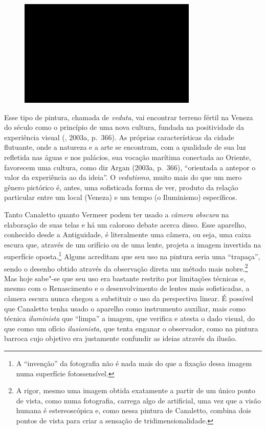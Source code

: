 \begin{figure}[!ht]

\centering
 \includegraphics[width=85mm]{./imgs/im1.jpg}
\caption{\tiny{}}

\end{figure}

Esse tipo de pintura, chamada de \emph{veduta}, vai encontrar terreno
fértil na Veneza do século  como o princípio de uma nova cultura,
fundada na positividade da experiência visual (, 2003a, p.~366). As
próprias características da cidade flutuante, onde a natureza e a arte
se encontram, com a qualidade de sua luz refletida nas águas e nos
palácios, sua vocação marítima conectada ao Oriente, favorecem uma
cultura, como diz Argan (2003a, p.~366), ``orientada a antepor o valor
da experiência ao da ideia''. O \emph{vedutismo}, muito mais do que um
mero gênero pictórico é, antes, uma sofisticada forma de ver, produto da
relação particular entre um local (Veneza) e um tempo (o Iluminismo)
específicos.

Tanto Canaletto quanto Vermeer podem ter usado a \emph{câmera obscura}
na elaboração de suas telas e há um caloroso debate acerca disso. Esse
aparelho, conhecido desde a Antiguidade, é literalmente uma câmera, ou
seja, uma caixa escura que, através de um orifício ou de uma lente,
projeta a imagem invertida na superfície oposta.\footnote{A ``invenção''
  da fotografia não é nada mais do que a fixação dessa imagem numa
  superfície fotossensível.} Alguns acreditam que seu uso na pintura
seria uma ``trapaça'', sendo o desenho obtido através da observação
direta um método mais nobre.\footnote{A rigor, mesmo uma imagem obtida
  exatamente a partir de um único ponto de vista, como numa fotografia,
  carrega algo de artificial, uma vez que a visão humana é
  estereoscópica e, como nessa pintura de Canaletto, combina dois pontos
  de vista para criar a sensação de tridimensionalidade.} Mas hoje
sabe"-se que seu uso era bastante restrito por limitações técnicas e,
mesmo com o Renascimento e o desenvolvimento de lentes mais
sofisticadas, a câmera escura nunca chegou a substituir o uso da
perspectiva linear. É possível que Canaletto tenha usado o aparelho como
instrumento auxiliar, mais como técnica \emph{iluminista} que ``limpa''
a imagem, que verifica e atesta o dado visual, do que como um ofício
\emph{ilusionista}, que tenta enganar o observador, como na pintura
barroca cujo objetivo era justamente confundir as ideias através da
ilusão.

